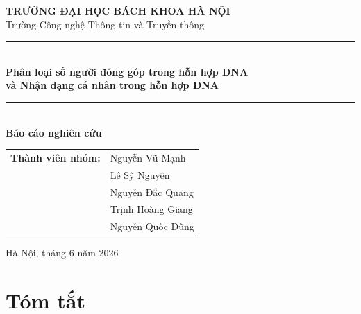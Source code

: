 \documentclass[12pt,a4paper]{article}
\begin{document}
\begin{titlepage}
  \centering
  \vspace*{1.0cm}

  {\large\textbf{TRƯỜNG ĐẠI HỌC BÁCH KHOA HÀ NỘI}}\\[0.25cm]
  {\normalsize Trường Công nghệ Thông tin và Truyền thông}\\[1.6cm]

  \rule{\linewidth}{1.4pt}\\[0.5cm]
  {\LARGE\bfseries Phân loại số người đóng góp trong hỗn hợp DNA}\\[0.25cm]
  {\LARGE\bfseries và Nhận dạng cá nhân trong hỗn hợp DNA}\\[0.5cm]
  \rule{\linewidth}{1.4pt}\\[1.4cm]

  {\large\textbf{Báo cáo nghiên cứu}}\\[1.3cm]

  \begin{tabular}{>{\bfseries}rl}
    Thành viên nhóm: & Nguyễn Vũ Mạnh \\[0.25cm]
                     & Lê Sỹ Nguyên \\[0.25cm]
                     & Nguyễn Đắc Quang \\[0.25cm]
                     & Trịnh Hoàng Giang \\[0.25cm]
                     & Nguyễn Quốc Dũng
  \end{tabular}

  \vfill
  {\large Hà Nội, tháng 6 năm 2026}
\end{titlepage}

\tableofcontents
\newpage

\section*{Tóm tắt}
\end{document}

